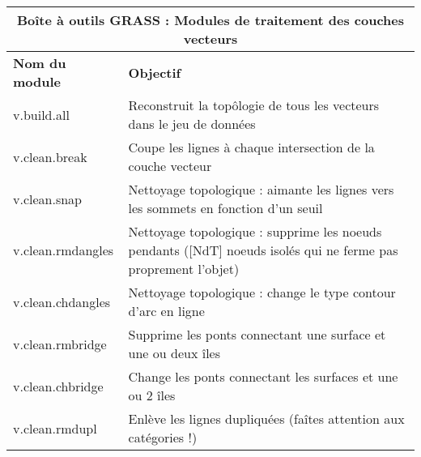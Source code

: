 \begin{table}[H]
\centering
 \begin{tabular}{|p{3cm}|p{11cm}|}
   \hline \multicolumn{2}{|c|}{\textbf{Boîte à outils GRASS : Modules de traitement des couches vecteurs}} \\
  \hline \textbf{Nom du module} & \textbf{Objectif} \\
  \hline v.build.all & Reconstruit la top\^ologie de tous les vecteurs dans le jeu de données\\
  \hline v.clean.break & Coupe les lignes à chaque intersection de la couche vecteur\\
  \hline v.clean.snap & Nettoyage topologique : aimante les lignes vers les sommets en fonction d'un seuil\\
  \hline v.clean.rmdangles & Nettoyage topologique : supprime les noeuds pendants ([NdT] noeuds isolés qui ne ferme pas proprement l'objet) \\
  \hline v.clean.chdangles & Nettoyage topologique : change le type contour d'arc en ligne \\
  \hline v.clean.rmbridge & Supprime les ponts connectant une surface et une ou deux îles\\
  \hline v.clean.chbridge & Change les ponts connectant les surfaces et une ou 2 îles \\
  \hline v.clean.rmdupl & Enlève les lignes dupliquées  (faîtes attention aux catégories !) \\

\end{tabular}
\end{table}
